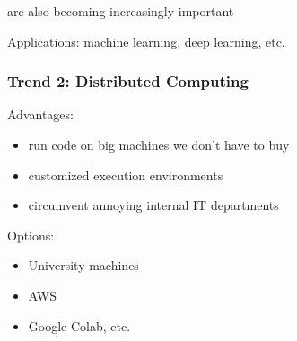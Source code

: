 \begin{frame}

     are also becoming increasingly important


    \begin{figure}
       \begin{center}
       \end{center}
    \end{figure}

    \vspace{0.5em}

    Applications: machine learning, deep learning, etc.
    

\end{frame}



\begin{frame}
    \frametitle{Trend 2: Distributed Computing}
    
    Advantages: 
    \begin{itemize}
        \item run code on big machines we don't have to buy
        \vspace{0.5em}
        \item customized execution environments
        \vspace{0.5em}
        \item circumvent annoying internal IT departments
    \end{itemize}

    \vspace{0.5em}

    Options:
    \begin{itemize}
        \item University machines
            \vspace{0.5em}
        \item AWS 
            \vspace{0.5em}
        \item Google Colab, etc.
    \end{itemize}

\end{frame}




